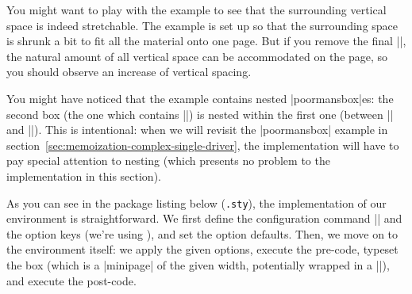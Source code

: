 \documentclass[a4paper,11pt]{article}
\begin{document}

You might want to play with the example to see that the surrounding vertical
space is indeed stretchable.  The example is set up so that the surrounding
space is shrunk a bit to fit all the material onto one page.  But if you remove
the final |\lipsum[144]|, the natural amount of all vertical space can be
accommodated on the page, so you should observe an increase of vertical
spacing.

You might have noticed that the example contains nested |poormansbox|es: the
second box (the one which contains |\lipsum[66]|) is nested within the first
one (between |\lipsum[101]| and |\lipsum[75]|).  This is intentional: when we
will revisit the |poormansbox| example in
section~\ref{sec:memoization-complex-single-driver}, the implementation will
have to pay special attention to nesting (which presents no problem to the
implementation in this section).

As you can see in the package listing below (\texttt{\examplename.sty}), the
implementation of our environment is straightforward.  We first define the
configuration command |\pmbset| and the option keys (we're using
), and set the option defaults.  Then, we move on to the
environment itself: we apply the given options, execute the pre-code, typeset
the box (which is a |minipage| of the given width, potentially wrapped in a
|\fbox|), and execute the post-code.

\end{document}
